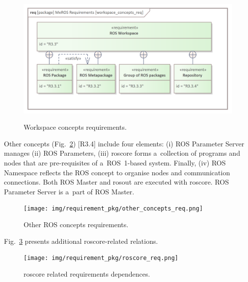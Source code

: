 \documentclass[11pt,oneside,a4paper]{report}
\begin{document}
	\begin{figure}[H]
		\centering
		\begin{center}
			{\includegraphics[scale=1.1]{img/requirement_pkg/workspace_concepts_req.png}}
		\end{center}
		\caption{Workspace concepts requirements.} 
		\label{fig:workspace_concepts_req}
	\end{figure}
	
	Other concepts (Fig.~\ref{fig:other_concepts_req}) [R3.4] include four elements: (i) ROS Parameter Server manages (ii) ROS Parameters, (iii) roscore forms a~collection of programs and nodes that are pre-requisites of a~ROS~1-based system. Finally, (iv) ROS Namespace reflects the ROS concept to organise nodes and communication connections. Both ROS Master and rosout are executed with roscore. ROS Parameter Server is a~part of ROS Master.
	
	\begin{figure}[H]
			\centering
			\begin{center}
					{\texttt{[image: img/requirement\_pkg/other\_concepts\_req.png]}}
				\end{center}
			\caption{Other ROS concepts requirements.} 
			\label{fig:other_concepts_req}
		\end{figure}

	Fig.~\ref{fig:roscore_req} presents additional roscore-related relations.


	\begin{figure}[H]
		\centering
		\begin{center}
			{\texttt{[image: img/requirement\_pkg/roscore\_req.png]}}
		\end{center}
		\caption{roscore related requirements dependences.} 
		\label{fig:roscore_req}
	\end{figure}
	
\end{document}
